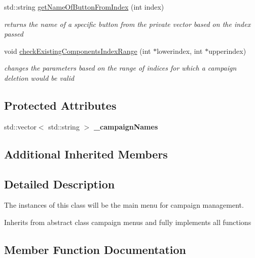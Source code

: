 \begin{DoxyCompactItemize}
\hypertarget{class_campaign_manager_af9bb0ad7faea22b9f3a04ea5d1c78f9b}{}\label{class_campaign_manager_af9bb0ad7faea22b9f3a04ea5d1c78f9b} 
std\+::string \hyperlink{class_campaign_manager_af9bb0ad7faea22b9f3a04ea5d1c78f9b}{get\+Name\+Of\+Button\+From\+Index} (int index)
\begin{DoxyCompactList}\small\item\em returns the name of a specific button from the private vector based on the index passed \end{DoxyCompactList}\item 
\hypertarget{class_campaign_manager_abeb07b6ab983afec3273240134a928b2}{}\label{class_campaign_manager_abeb07b6ab983afec3273240134a928b2} 
void \hyperlink{class_campaign_manager_abeb07b6ab983afec3273240134a928b2}{check\+Existing\+Components\+Index\+Range} (int $\ast$lowerindex, int $\ast$upperindex)
\begin{DoxyCompactList}\small\item\em changes the parameters based on the range of indices for which a campaign deletion would be valid \end{DoxyCompactList}\end{DoxyCompactItemize}
\subsection*{Protected Attributes}
\begin{DoxyCompactItemize}
\item 
\hypertarget{class_campaign_manager_aeb7ea1188d597534f0da5f4a9e3eca16}{}\label{class_campaign_manager_aeb7ea1188d597534f0da5f4a9e3eca16} 
std\+::vector$<$ std\+::string $>$ {\bfseries \+\_\+campaign\+Names}
\end{DoxyCompactItemize}
\subsection*{Additional Inherited Members}


\subsection{Detailed Description}
The instances of this class will be the main menu for campaign management. 

Inherits from abstract class campaign menus and fully implements all functions 

\subsection{Member Function Documentation}
\hypertarget{class_campaign_manager_af4ec02e5399f2a7bea50454eedd4ea62}{}\label{class_campaign_manager_af4ec02e5399f2a7bea50454eedd4ea62} 
